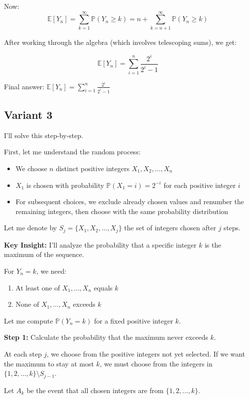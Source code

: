 \documentclass[12pt,a4paper]{article}
\theoremstyle{definition}
\begin{document}
    Now:
    $$\mathbb{E}[Y_n] = \sum_{k=1}^{\infty} \mathbb{P}(Y_n \geq k) = n + \sum_{k=n+1}^{\infty} \mathbb{P}(Y_n \geq k)$$

    After working through the algebra (which involves telescoping sums), we get:

    $$\mathbb{E}[Y_n] = \sum_{i=1}^{n} \frac{2^i}{2^i - 1}$$

    Final answer: $\mathbb{E}[Y_n] = \sum_{i=1}^{n}\frac{2^i}{2^i - 1}$
\subsection{Variant 3}
    I'll solve this step-by-step.

    First, let me understand the random process:
    \begin{itemize}
        \item We choose $n$ distinct positive integers $X_1, X_2, \ldots, X_n$
        \item $X_1$ is chosen with probability $\mathbb{P}(X_1 = i) = 2^{-i}$ for each positive integer $i$
        \item For subsequent choices, we exclude already chosen values and renumber the remaining integers, then choose with the same probability distribution
    \end{itemize}

    Let me denote by $S_j = \{X_1, X_2, \ldots, X_j\}$ the set of integers chosen after $j$ steps.

    \textbf{Key Insight:} I'll analyze the probability that a specific integer $k$ is the maximum of the sequence.

    For $Y_n = k$, we need:
    \begin{enumerate}
        \item At least one of $X_1, \ldots, X_n$ equals $k$
        \item None of $X_1, \ldots, X_n$ exceeds $k$
    \end{enumerate}

    Let me compute $\mathbb{P}(Y_n = k)$ for a fixed positive integer $k$.

    \textbf{Step 1:} Calculate the probability that the maximum never exceeds $k$.

    At each step $j$, we choose from the positive integers not yet selected. If we want the maximum to stay at most $k$, we must choose from the integers in $\{1, 2, \ldots, k\} \setminus S_{j-1}$.

    Let $A_k$ be the event that all chosen integers are from $\{1, 2, \ldots, k\}$.
\end{document}

